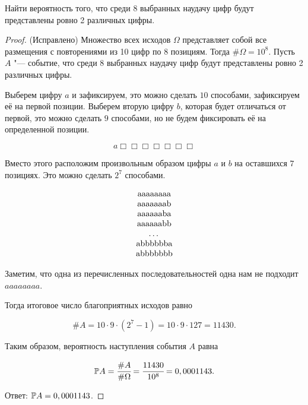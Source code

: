 
\renewcommand*{\proofname}{Решение}

\begin{problem}
Найти вероятность того, что среди 8 выбранных наудачу цифр будут представлены ровно 2 различных цифры.
\end{problem}

\begin{proof} (Исправлено)
	Множество всех исходов \(\Omega \) представляет собой все размещения с повторениями из 10 цифр по 8 позициям. Тогда \(\#\Omega = 10^8\). Пусть \(A\) "--- событие, что среди 8 выбранных наудачу цифр будут представлены ровно 2 различных цифры.

	Выберем цифру $a$ и зафиксируем, это можно сделать $10$ способами, зафиксируем её на первой позиции. Выберем вторую цифру $b$, которая будет отличаться от первой, это можно сделать $9$ способами, но не будем фиксировать её на определенной позиции.

	\[
		a \Box  \Box  \Box  \Box  \Box  \Box  \Box
	\]

	Вместо этого расположим произвольным образом цифры $a$ и $b$ на оставшихся $7$ позициях. Это можно сделать $2^7$ способами.

	\[
		\begin{tabular}{c}
			aaaaaaaa \\
			aaaaaaab \\
			aaaaaaba \\
			aaaaaabb \\
			\ldots   \\
			abbbbbba \\
			abbbbbbb \\
		\end{tabular}
	\]

	Заметим, что одна из перечисленных последовательностей одна нам не подходит \(aaaaaaaa\).

	Тогда итоговое число благоприятных исходов равно

	\[
		\#A = 10 \cdot 9 \cdot (2^7 - 1) = 10 \cdot 9 \cdot 127 = 11430.
	\]

	Таким образом, вероятность наступления события \(A\) равна

	\[
		\mathbb P A = \cfrac{\#A}{\#\Omega} = \cfrac{11430}{10^8} = 0,0001143.
	\]

	Ответ: \(\mathbb P A = 0,0001143\).



\end{proof}

